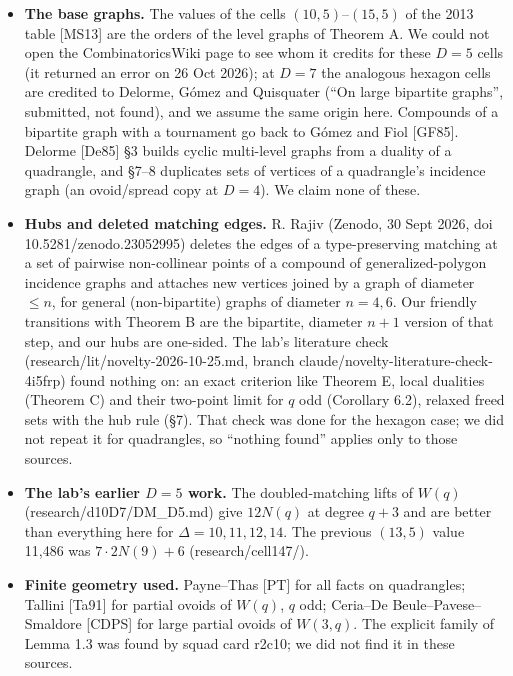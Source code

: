 \documentclass[
  11pt,
]{article}
\providecommand{\tightlist}{%
  \setlength{\itemsep}{0pt}\setlength{\parskip}{0pt}}
\begin{document}
\begin{itemize}
\tightlist
\item
  \textbf{The base graphs.} The values of the cells
  \((10,5)\)--\((15,5)\) of the 2013 table {[}MS13{]} are the orders of
  the level graphs of Theorem A. We could not open the CombinatoricsWiki
  page to see whom it credits for these \(D = 5\) cells (it returned an
  error on 26 Oct 2026); at \(D = 7\) the analogous hexagon cells are
  credited to Delorme, Gómez and Quisquater (``On large bipartite
  graphs'', submitted, not found), and we assume the same origin here.
  Compounds of a bipartite graph with a tournament go back to Gómez and
  Fiol {[}GF85{]}. Delorme {[}De85{]} §3 builds cyclic multi-level
  graphs from a duality of a quadrangle, and §7--8 duplicates sets of
  vertices of a quadrangle's incidence graph (an ovoid/spread copy at
  \(D = 4\)). We claim none of these.
\item
  \textbf{Hubs and deleted matching edges.} R. Rajiv (Zenodo, 30 Sept
  2026, doi 10.5281/zenodo.23052995) deletes the edges of a
  type-preserving matching at a set of pairwise non-collinear points of
  a compound of generalized-polygon incidence graphs and attaches new
  vertices joined by a graph of diameter \(\le n\), for general
  (non-bipartite) graphs of diameter \(n = 4, 6\). Our friendly
  transitions with Theorem B are the bipartite, diameter \(n+1\) version
  of that step, and our hubs are one-sided. The lab's literature check
  (research/lit/novelty-2026-10-25.md, branch
  claude/novelty-literature-check-4i5frp) found nothing on: an exact
  criterion like Theorem E, local dualities (Theorem C) and their
  two-point limit for \(q\) odd (Corollary 6.2), relaxed freed sets with
  the hub rule (§7). That check was done for the hexagon case; we did
  not repeat it for quadrangles, so ``nothing found'' applies only to
  those sources.
\item
  \textbf{The lab's earlier \(D = 5\) work.} The doubled-matching lifts
  of \(W(q)\) (research/d10D7/DM\_D5.md) give \(12N(q)\) at degree
  \(q+3\) and are better than everything here for
  \(\Delta = 10, 11, 12, 14\). The previous \((13,5)\) value 11,486 was
  \(7\cdot 2N(9)+6\) (research/cell147/).
\item
  \textbf{Finite geometry used.} Payne--Thas {[}PT{]} for all facts on
  quadrangles; Tallini {[}Ta91{]} for partial ovoids of \(W(q)\), \(q\)
  odd; Ceria--De Beule--Pavese--Smaldore {[}CDPS{]} for large partial
  ovoids of \(W(3,q)\). The explicit family of Lemma 1.3 was found by
  squad card r2c10; we did not find it in these sources.
\end{itemize}
\end{document}
